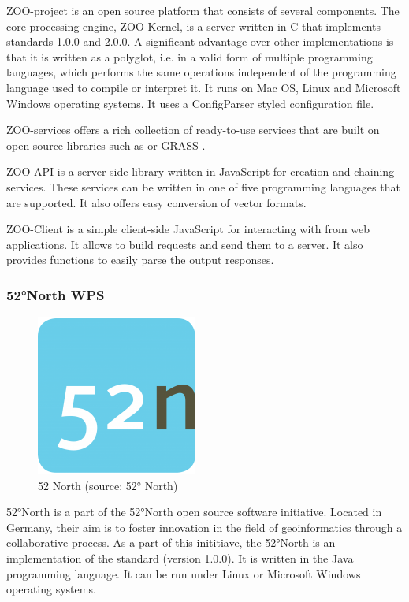 ZOO-project is an open source  platform that consists of several
components. The core processing engine, ZOO-Kernel, is a  server
written in C that implements  standards 1.0.0 and 2.0.0.\cite{zoo}
A significant advantage over other  implementations is that it is
written as a polyglot, i.e. in a valid form of multiple programming
languages, which performs the same operations independent of the
programming language used to compile or interpret it.\cite{polyglot}
It runs on Mac OS, Linux and Microsoft Windows operating systems. It
uses a ConfigParser styled configuration file.

ZOO-services offers a rich collection of ready-to-use services that
are built on open source libraries such as  or GRASS .

ZOO-API is a server-side library written in JavaScript for creation
and chaining services. These services can be written in one of five
programming languages that are supported. It also offers easy
conversion of vector formats.

ZOO-Client is a simple client-side JavaScript  for interacting with
 from web applications. It allows to build  requests and send
them to a  server. \cite{zooclient} It also provides functions to easily parse the
output  responses.


\subsubsection{52°North WPS}
\begin{figure}[H] \centering
      \includegraphics[width=150pt]{./pictures/52n.png}
      \caption[52° North logo]{52 North (source: 52° North)}
      \label{fig:52 North}
  \end{figure}

52°North  is a part of the 52°North open source software
initiative. Located in Germany, their aim is to foster innovation in
the field of geoinformatics through a collaborative process. As a part
of this inititiave, the 52°North  is an implementation of the 
 standard (version 1.0.0). It is written in the Java programming
language. It can be run under Linux or Microsoft Windows operating
systems.

